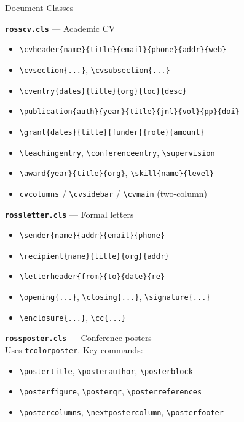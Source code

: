 \documentclass[palette=lancet]{rossbeamerscientific}
\newcommand{\cmd}[1]{\texttt{\color{rbAccent}\textbackslash #1}}
\newcommand{\env}[1]{\texttt{\color{rbSecondary}#1}}
\newcommand{\cls}[1]{\texttt{\color{rbPrimary}\bfseries #1}}
\begin{document}
\begin{frame}{Document Classes}
\begin{twocol}
\colbreak
  \textbf{\cls{rosscv.cls}} --- Academic CV
  \begin{itemize}\setlength\itemsep{0pt}
    \item \cmd{cvheader\{name\}\{title\}\{email\}\{phone\}\{addr\}\{web\}}
    \item \cmd{cvsection\{...\}}, \cmd{cvsubsection\{...\}}
    \item \cmd{cventry\{dates\}\{title\}\{org\}\{loc\}\{desc\}}
    \item \cmd{publication\{auth\}\{year\}\{title\}\{jnl\}\{vol\}\{pp\}\{doi\}}
    \item \cmd{grant\{dates\}\{title\}\{funder\}\{role\}\{amount\}}
    \item \cmd{teachingentry}, \cmd{conferenceentry}, \cmd{supervision}
    \item \cmd{award\{year\}\{title\}\{org\}}, \cmd{skill\{name\}\{level\}}
    \item \env{cvcolumns} / \cmd{cvsidebar} / \cmd{cvmain} (two-column)
  \end{itemize}
  \vskip6pt

  \textbf{\cls{rossletter.cls}} --- Formal letters
  \begin{itemize}\setlength\itemsep{0pt}
    \item \cmd{sender\{name\}\{addr\}\{email\}\{phone\}}
    \item \cmd{recipient\{name\}\{title\}\{org\}\{addr\}}
    \item \cmd{letterheader\{from\}\{to\}\{date\}\{re\}}
    \item \cmd{opening\{...\}}, \cmd{closing\{...\}}, \cmd{signature\{...\}}
    \item \cmd{enclosure\{...\}}, \cmd{cc\{...\}}
  \end{itemize}
  \vskip6pt

  \textbf{\cls{rossposter.cls}} --- Conference posters\\
  Uses \texttt{tcolorposter}. Key commands:
  \begin{itemize}\setlength\itemsep{0pt}
    \item \cmd{postertitle}, \cmd{posterauthor}, \cmd{posterblock}
    \item \cmd{posterfigure}, \cmd{posterqr}, \cmd{posterreferences}
    \item \cmd{postercolumns}, \cmd{nextpostercolumn}, \cmd{posterfooter}
  \end{itemize}
\end{twocol}
\end{frame}
\end{document}
